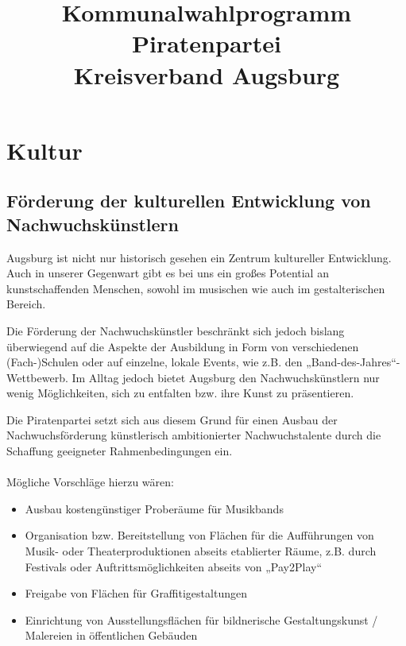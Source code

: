 \documentclass[a5paper, twoside, ngerman, 10pt]{scrbook}
\title{\Piraten \color{pgray} Kommunalwahlprogramm\\     
       Piratenpartei\\Kreisverband Augsburg}
\begin{document}
  \maketitle
  
  \tableofcontents
  
  \chapter{Kultur}
  
  \section{Förderung der kulturellen Entwicklung von Nachwuchskünstlern}
  Augsburg ist nicht nur historisch gesehen ein Zentrum kultureller 
  Entwicklung. Auch in unserer Gegenwart gibt es bei uns ein großes Potential 
  an kunstschaffenden Menschen, sowohl im musischen wie auch im 
  gestalterischen Bereich.
  
  Die Förderung der Nachwuchskünstler beschränkt sich jedoch bislang 
  überwiegend auf die Aspekte der Ausbildung in Form von verschiedenen 
  (Fach-)Schulen oder auf einzelne, lokale Events, wie z.B. den 
  „Band-des-Jahres“-Wettbewerb. Im Alltag jedoch bietet Augsburg den 
  Nachwuchskünstlern nur wenig Möglichkeiten, sich zu entfalten bzw. ihre 
  Kunst zu präsentieren.
  
  Die Piratenpartei setzt sich aus diesem Grund für einen Ausbau der 
  Nachwuchsförderung künstlerisch ambitionierter Nachwuchstalente durch die 
  Schaffung geeigneter Rahmenbedingungen ein.\\
  \\
  Mögliche Vorschläge hierzu wären:
  
  \begin{itemize}
    \item Ausbau kostengünstiger Proberäume für Musikbands
    \item Organisation bzw. Bereitstellung von Flächen für die Aufführungen
          von Musik- oder Theaterproduktionen abseits etablierter Räume, z.B. 
          durch Festivals oder Auftrittsmöglichkeiten abseits von „Pay2Play“
    \item Freigabe von Flächen für Graffitigestaltungen
    \item Einrichtung von Ausstellungsflächen für bildnerische 
          Gestaltungskunst / Malereien in öffentlichen Gebäuden 
  \end{itemize}
  
\end{document}
